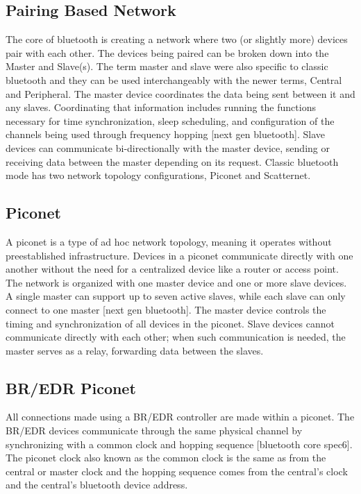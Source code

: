 \subsection{Pairing Based Network}
The core of bluetooth is creating a network where two (or slightly more) devices pair with each other. 
The devices being paired can be broken down into the Master and Slave(s). 
The term master and slave were also specific to classic bluetooth and they can be used interchangeably with the newer terms, Central and Peripheral. 
The master device coordinates the data being sent between it and any slaves. 
Coordinating that information includes running the functions necessary for time synchronization, sleep scheduling, and configuration of the channels being used through frequency hopping [next gen bluetooth]. 
Slave devices can communicate bi-directionally with the master device, sending or receiving data between the master depending on its request. 
Classic bluetooth mode has two network topology configurations, Piconet and Scatternet. 

\subsection{Piconet}
A piconet is a type of ad hoc network topology, meaning it operates without preestablished infrastructure. 
Devices in a piconet communicate directly with one another without the need for a centralized device like a router or access point.
The network is organized with one master device and one or more slave devices. 
A single master can support up to seven active slaves, while each slave can only connect to one master [next gen bluetooth].
The master device controls the timing and synchronization of all devices in the piconet. 
Slave devices cannot communicate directly with each other; when such communication is needed, the master serves as a relay, forwarding data between the slaves.

\subsection{BR/EDR Piconet}
All connections made using a BR/EDR controller are made within a piconet. 
The BR/EDR devices communicate through the same physical channel by synchronizing with a common clock and hopping sequence [bluetooth core spec6].
The piconet clock also known as the common clock is the same as from the central or master clock and the hopping sequence comes from the central’s clock and the central’s bluetooth device address. 

